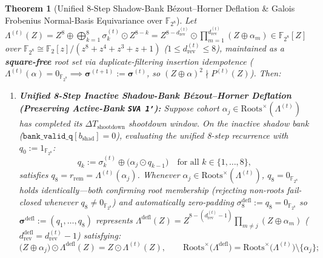 \documentclass[10pt,twocolumn]{article}
\theoremstyle{spectralthm}
\newtheorem{theorem}{Theorem}[section]
\begin{document}
\begin{theorem}[Unified 8-Step Shadow-Bank B\'{e}zout--Horner Deflation \& Galois Frobenius Normal-Basis Equivariance over $\mathbb{F}_{2^8}$]
\label{thm:vieta_deflation_galois}
Let $\Lambda^{(t)}(Z) = Z^8 \oplus \bigoplus_{k=1}^8 \sigma_k^{(t)} \odot Z^{8-k} = Z^{8 - d_{\mathrm{rev}}^{(t)}} \odot \prod_{m=1}^{d_{\mathrm{rev}}^{(t)}}(Z \oplus \alpha_m) \in \mathbb{F}_{2^8}[Z]$ over $\mathbb{F}_{2^8} \cong \mathbb{F}_2[z]/(z^8 + z^4 + z^3 + z + 1)$ ($1 \le d_{\mathrm{rev}}^{(t)} \le 8$), maintained as a \textbf{square-free} root set via duplicate-filtering insertion idempotence ($\Lambda^{(t)}(\alpha) = 0_{\mathbb{F}_{2^8}} \implies \boldsymbol{\sigma}^{(t+1)} := \boldsymbol{\sigma}^{(t)}$, so $(Z \oplus \alpha)^2 \nmid P^{(t)}(Z)$). Then:
\begin{enumerate}
  \item[(i)] \textbf{Unified 8-Step Inactive Shadow-Bank B\'{e}zout--Horner Deflation (Preserving Active-Bank \texttt{SVA 1'}):} Suppose cohort $\alpha_j \in \mathrm{Roots}^\times(\Lambda^{(t)})$ has completed its $\Delta T_{\mathrm{shootdown}}$ shootdown window. On the \emph{inactive shadow bank} ($\texttt{bank\_valid\_q}[b_{\mathrm{shad}}] = 0$), evaluating the unified 8-step recurrence with $q_0 := 1_{\mathbb{F}_{2^8}}$:
  \begin{equation}
  \label{eq:bezout_horner}
  q_k := \sigma_k^{(t)} \oplus \bigl(\alpha_j \odot q_{k-1}\bigr)\quad\text{for all } k \in \{1,\ldots,8\},
  \end{equation}
  satisfies $q_8 = r_{\mathrm{rem}} = \Lambda^{(t)}(\alpha_j)$. Whenever $\alpha_j \in \mathrm{Roots}^\times(\Lambda^{(t)})$, $q_8 = 0_{\mathbb{F}_{2^8}}$ holds identically---both confirming root membership (rejecting non-roots fail-closed whenever $q_8 \neq 0_{\mathbb{F}_{2^8}}$) and automatically zero-padding $\sigma_8^{\mathrm{defl}} := q_8 = 0_{\mathbb{F}_{2^8}}$ so $\boldsymbol{\sigma}^{\mathrm{defl}} := (q_1,\ldots,q_8)$ represents $\Lambda^{\mathrm{defl}}(Z) = Z^{8-(d_{\mathrm{rev}}^{(t)}-1)} \prod_{m \neq j}(Z \oplus \alpha_m)$ ($d_{\mathrm{rev}}^{\mathrm{defl}} = d_{\mathrm{rev}}^{(t)} - 1$) satisfying:
  \begin{equation}
  \label{eq:bezout_exact}
  \bigl(Z \oplus \alpha_j\bigr) \odot \Lambda^{\mathrm{defl}}(Z) = Z \odot \Lambda^{(t)}(Z),\qquad
  \mathrm{Roots}^\times\bigl(\Lambda^{\mathrm{defl}}\bigr) = \mathrm{Roots}^\times\bigl(\Lambda^{(t)}\bigr) \setminus \{\alpha_j\};
  \end{equation}

\end{enumerate}
\end{theorem}
\end{document}
